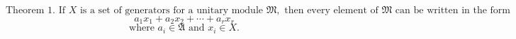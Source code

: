 $$
\text{Theorem 1. If } X \text{ is a set of generators for a unitary module } \mathfrak{M},
\text{ then every element of } \mathfrak{M} \text{ can be written in the form}
$$
$$
a_1 x_1 + a_2 x_2 + \cdots + a_r x_r
$$
$$
\text{where } a_i \in \mathfrak{A} \text{ and } x_i \in X.
$$
